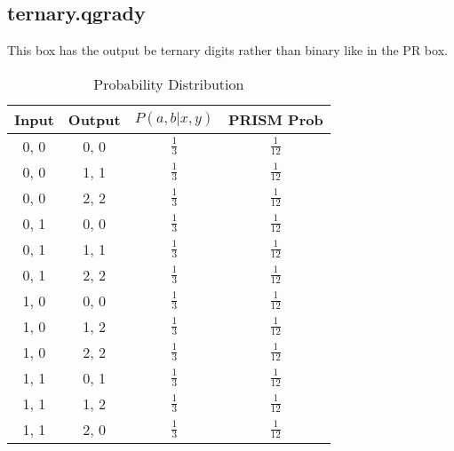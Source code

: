 \documentclass[report.tex]{subfiles}
\begin{document}
\subsection{ternary.qgrady} %
\label{sub:ternary_qgrady}
This box has the output be ternary digits rather than binary like in the PR box.
\begin{table}[H]
  \centering
  \begin{tabular}{c | c | c | c}
    Input & Output & \(P(a, b | x, y)\) & PRISM Prob \\
    \hline
    0, 0 & 0, 0 & \(\frac{1}{3}\) & \(\frac{1}{12}\) \\
    0, 0 & 1, 1 & \(\frac{1}{3}\) & \(\frac{1}{12}\) \\
    0, 0 & 2, 2 & \(\frac{1}{3}\) & \(\frac{1}{12}\) \\
    0, 1 & 0, 0 & \(\frac{1}{3}\) & \(\frac{1}{12}\) \\
    0, 1 & 1, 1 & \(\frac{1}{3}\) & \(\frac{1}{12}\) \\
    0, 1 & 2, 2 & \(\frac{1}{3}\) & \(\frac{1}{12}\) \\
    1, 0 & 0, 0 & \(\frac{1}{3}\) & \(\frac{1}{12}\) \\
    1, 0 & 1, 2 & \(\frac{1}{3}\) & \(\frac{1}{12}\) \\
    1, 0 & 2, 2 & \(\frac{1}{3}\) & \(\frac{1}{12}\) \\
    1, 1 & 0, 1 & \(\frac{1}{3}\) & \(\frac{1}{12}\) \\
    1, 1 & 1, 2 & \(\frac{1}{3}\) & \(\frac{1}{12}\) \\
    1, 1 & 2, 0 & \(\frac{1}{3}\) & \(\frac{1}{12}\) \\
  \end{tabular}
  \caption{Probability Distribution}
  \label{tab:ternary_qgrady}
\end{table}
\end{document}

